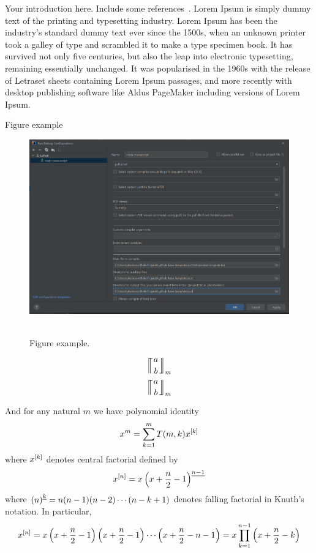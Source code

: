 Your introduction here.
Include some references~\cite{derivative_of_polynomials_via_double_limit, alekseyev2018mathoverflow, oeis_coefficients_u_m_l_k_defined_by_polynomial_identity_3}.
Lorem Ipsum is simply dummy text of the printing and typesetting industry.
Lorem Ipsum has been the industry's standard dummy text ever since the 1500s, when an unknown printer took a galley
of type and scrambled it to make a type specimen book.
It has survived not only five centuries, but also the leap into electronic typesetting, remaining essentially unchanged.
It was popularised in the 1960s with the release of Letraset sheets containing Lorem Ipsum passages, and more
recently with desktop publishing software like Aldus PageMaker including versions of Lorem Ipsum.

Figure example
\begin{figure}[H]
    \centering
    \includegraphics[width=1\textwidth]{sections/images/latex_configuration}
    ~\caption{Figure example.}\label{fig:figure}
\end{figure}



\begin{equation*}
    \llceil \nobarfrac{a}{b} \rrfloor_{m}
\end{equation*}
\begin{equation*}
    \llceilCoefficient{a}{b}{m}
\end{equation*}

And for any natural $m$ we have polynomial identity
\begin{equation}
    x^m = \sum_{k=1}^{m} T(m, k) x^{[k]}
    \label{eq:knuth-power-identity}
\end{equation}
where $x^{[k]}$ denotes central factorial defined by
\begin{equation*}
    x^{[n]} = x \left(x+\frac{n}{2}-1 \right)^{\underline{n-1}}
\end{equation*}
where $\left(n \right)^{\underline{k}} = n (n-1) (n-2) \cdots (n-k+1)$ denotes falling factorial in Knuth's notation.
In particular,
\begin{equation}
    x^{[n]}
    = x \left( x+\frac{n}{2}-1 \right) \left( x+\frac{n}{2}-1 \right) \cdots \left (x+\frac{n}{2}-n-1 \right)
    = x \prod_{k=1}^{n-1} \left( x+\frac{n}{2}-k \right)\label{eq:equation}
\end{equation}
